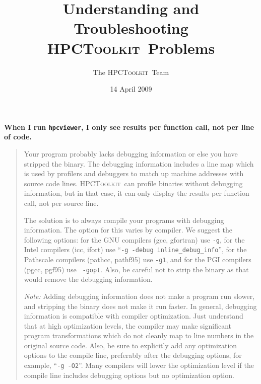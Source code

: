 \documentclass{article}
\newcommand{\hpctoolkit}{\textsc{HPCToolkit}}
\newcommand{\hpcviewer}{\texttt{hpcviewer}}
\begin{document}
\title{Understanding and Troubleshooting \\
         \hpctoolkit\ Problems}
\author{The \hpctoolkit\ Team}
\date{14 April 2009}
\maketitle


\textbf{When I run \hpcviewer, I only see results per function call,
not per line of code.}
\begin{quote}
Your program probably lacks debugging information or else you have
stripped the binary.  The debugging information includes a line map
which is used by profilers and debuggers to match up machine addresses
with source code lines.  \hpctoolkit\ can profile binaries without
debugging information, but in that case, it can only display the
results per function call, not per source line.

The solution is to always compile your programs with debugging
information.  The option for this varies by compiler.  We suggest the
following options: for the GNU compilers (gcc, gfortran) use {\tt -g},
for the Intel compilers (icc, ifort) use ``{\tt -g -debug
inline\_debug\_info}'', for the Pathscale compilers (pathcc, pathf95)
use {\tt -g1}, and for the PGI compilers (pgcc, pgf95) use {\tt
-gopt}.  Also, be careful not to strip the binary as that would remove
the debugging information.

{\it Note:} Adding debugging information does not make a program run
slower, and stripping the binary does not make it run faster.  In
general, debugging information is compatible with compiler
optimization.  Just understand that at high optimization levels, the
compiler may make significant program transformations which do not
cleanly map to line numbers in the original source code.  Also, be
sure to explicitly add any optimization options to the compile line,
preferably after the debugging options, for example, ``{\tt -g -O2}''.
Many compilers will lower the optimization level if the compile line
includes debugging options but no optimization option.
\end{quote}
\end{document}
